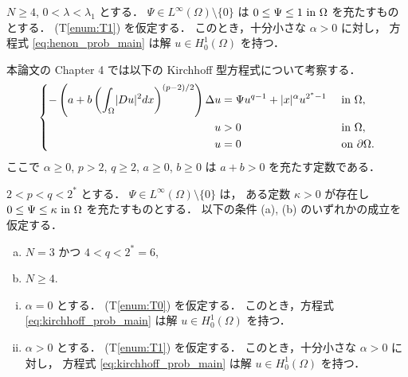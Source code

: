 \begin{thm}[Theorem 1.1.1] \label{thm:henon_main}
  $N \geq 4$, $0 < \lambda < \lambda_1$ とする．
  $\Psi \in L^\infty(\Omega) \setminus \{ 0 \}$
  は $0 \leq \Psi \leq 1 \text{ in } \Omega$ を充たすものとする．
  (T\ref{enum:T1}) を仮定する．
  このとき，十分小さな $\alpha > 0$ に対し，
  方程式 \eqref{eq:henon_prob_main}
  は解 $u \in H_0^1(\Omega)$ を持つ．
\end{thm}

本論文の Chapter 4 では以下の Kirchhoff 型方程式について考察する．
\begin{align}
  \left\{
  \begin{aligned}
    - \left( a + b \left( \int_\Omega \lvert Du \rvert^2 dx \right)^{(p-2)/2} \right) \Delta u &= \Psi u^{q-1} + \lvert x \rvert^\alpha u^{2^* - 1}
               &                                                     & \text{ in } \Omega,                        \\
    u          & > 0                                                 &              & \text{ in } \Omega,         \\
    u          & = 0                                                 &              & \text{ on } \partial\Omega.
  \end{aligned}
  \right. \label{eq:kirchhoff_prob_main}
\end{align}
ここで $\alpha \geq 0$, $p > 2$, $q \geq 2$, $a \geq 0$, $b \geq 0$
は $a + b > 0$ を充たす定数である．

\begin{thm}[Theorem~1.1.2] \label{thm:kirchhoff_main}
  $2 < p < q < 2^*$ とする．
  $\Psi \in L^\infty(\Omega) \setminus \{ 0 \}$ は，
  ある定数 $\kappa > 0$ が存在し
  $0 \leq \Psi \leq \kappa \text{ in } \Omega$
  を充たすものとする．
  以下の条件 (a), (b) のいずれかの成立を仮定する．
  \begin{enumerate}[(a)]
    \item $N = 3$ かつ $4 < q < 2^* = 6$,
    \item $N \geq 4$.
  \end{enumerate}
  \begin{enumerate}[(i)]
    \item
      $\alpha = 0$ とする． (T\ref{enum:T0}) を仮定する．
      このとき，方程式 \eqref{eq:kirchhoff_prob_main}
      は解 $u \in H_0^1(\Omega)$ を持つ．
    \item
      $\alpha > 0$ とする． (T\ref{enum:T1}) を仮定する．
      このとき，十分小さな $\alpha > 0$ に対し，
      方程式 \eqref{eq:kirchhoff_prob_main}
      は解 $u \in H_0^1(\Omega)$ を持つ．
  \end{enumerate}
\end{thm}

